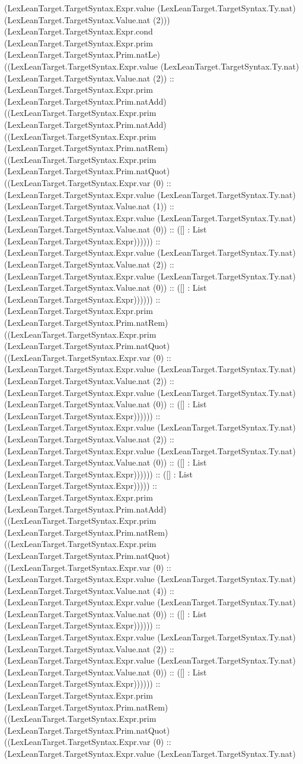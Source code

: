\documentclass[11pt]{article}
\begin{document}
(LexLeanTarget.TargetSyntax.Expr.value (LexLeanTarget.TargetSyntax.Ty.nat) (LexLeanTarget.TargetSyntax.Value.nat (2))) (LexLeanTarget.TargetSyntax.Expr.cond (LexLeanTarget.TargetSyntax.Expr.prim (LexLeanTarget.TargetSyntax.Prim.natLe) ((LexLeanTarget.TargetSyntax.Expr.value (LexLeanTarget.TargetSyntax.Ty.nat) (LexLeanTarget.TargetSyntax.Value.nat (2)) :: (LexLeanTarget.TargetSyntax.Expr.prim (LexLeanTarget.TargetSyntax.Prim.natAdd) ((LexLeanTarget.TargetSyntax.Expr.prim (LexLeanTarget.TargetSyntax.Prim.natAdd) ((LexLeanTarget.TargetSyntax.Expr.prim (LexLeanTarget.TargetSyntax.Prim.natRem) ((LexLeanTarget.TargetSyntax.Expr.prim (LexLeanTarget.TargetSyntax.Prim.natQuot) ((LexLeanTarget.TargetSyntax.Expr.var (0) :: (LexLeanTarget.TargetSyntax.Expr.value (LexLeanTarget.TargetSyntax.Ty.nat) (LexLeanTarget.TargetSyntax.Value.nat (1)) :: (LexLeanTarget.TargetSyntax.Expr.value (LexLeanTarget.TargetSyntax.Ty.nat) (LexLeanTarget.TargetSyntax.Value.nat (0)) :: ([] : List (LexLeanTarget.TargetSyntax.Expr)))))) :: (LexLeanTarget.TargetSyntax.Expr.value (LexLeanTarget.TargetSyntax.Ty.nat) (LexLeanTarget.TargetSyntax.Value.nat (2)) :: (LexLeanTarget.TargetSyntax.Expr.value (LexLeanTarget.TargetSyntax.Ty.nat) (LexLeanTarget.TargetSyntax.Value.nat (0)) :: ([] : List (LexLeanTarget.TargetSyntax.Expr)))))) :: (LexLeanTarget.TargetSyntax.Expr.prim (LexLeanTarget.TargetSyntax.Prim.natRem) ((LexLeanTarget.TargetSyntax.Expr.prim (LexLeanTarget.TargetSyntax.Prim.natQuot) ((LexLeanTarget.TargetSyntax.Expr.var (0) :: (LexLeanTarget.TargetSyntax.Expr.value (LexLeanTarget.TargetSyntax.Ty.nat) (LexLeanTarget.TargetSyntax.Value.nat (2)) :: (LexLeanTarget.TargetSyntax.Expr.value (LexLeanTarget.TargetSyntax.Ty.nat) (LexLeanTarget.TargetSyntax.Value.nat (0)) :: ([] : List (LexLeanTarget.TargetSyntax.Expr)))))) :: (LexLeanTarget.TargetSyntax.Expr.value (LexLeanTarget.TargetSyntax.Ty.nat) (LexLeanTarget.TargetSyntax.Value.nat (2)) :: (LexLeanTarget.TargetSyntax.Expr.value (LexLeanTarget.TargetSyntax.Ty.nat) (LexLeanTarget.TargetSyntax.Value.nat (0)) :: ([] : List (LexLeanTarget.TargetSyntax.Expr)))))) :: ([] : List (LexLeanTarget.TargetSyntax.Expr))))) :: (LexLeanTarget.TargetSyntax.Expr.prim (LexLeanTarget.TargetSyntax.Prim.natAdd) ((LexLeanTarget.TargetSyntax.Expr.prim (LexLeanTarget.TargetSyntax.Prim.natRem) ((LexLeanTarget.TargetSyntax.Expr.prim (LexLeanTarget.TargetSyntax.Prim.natQuot) ((LexLeanTarget.TargetSyntax.Expr.var (0) :: (LexLeanTarget.TargetSyntax.Expr.value (LexLeanTarget.TargetSyntax.Ty.nat) (LexLeanTarget.TargetSyntax.Value.nat (4)) :: (LexLeanTarget.TargetSyntax.Expr.value (LexLeanTarget.TargetSyntax.Ty.nat) (LexLeanTarget.TargetSyntax.Value.nat (0)) :: ([] : List (LexLeanTarget.TargetSyntax.Expr)))))) :: (LexLeanTarget.TargetSyntax.Expr.value (LexLeanTarget.TargetSyntax.Ty.nat) (LexLeanTarget.TargetSyntax.Value.nat (2)) :: (LexLeanTarget.TargetSyntax.Expr.value (LexLeanTarget.TargetSyntax.Ty.nat) (LexLeanTarget.TargetSyntax.Value.nat (0)) :: ([] : List (LexLeanTarget.TargetSyntax.Expr)))))) :: (LexLeanTarget.TargetSyntax.Expr.prim (LexLeanTarget.TargetSyntax.Prim.natRem) ((LexLeanTarget.TargetSyntax.Expr.prim (LexLeanTarget.TargetSyntax.Prim.natQuot) ((LexLeanTarget.TargetSyntax.Expr.var (0) :: (LexLeanTarget.TargetSyntax.Expr.value (LexLeanTarget.TargetSyntax.Ty.nat) 
\end{document}
